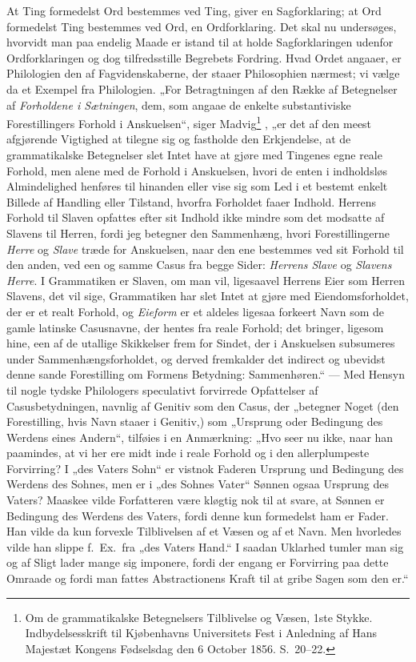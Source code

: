 \documentclass[12pt]{book}
\newcommand{\opage}[1]{\marginnote{\footnotesize\textit{[#1]}}}
\begin{document}
At Ting formedelst Ord bestemmes ved Ting, giver en Sagforklaring; at Ord formedelst Ting bestemmes ved Ord, en Ordforklaring. Det skal nu undersøges, hvorvidt man paa endelig Maade er istand til at holde Sagforklaringen udenfor Ordforklaringen og dog tilfredsstille Begrebets Fordring. Hvad Ordet angaaer, er Philologien den af Fagvidenskaberne, der staaer Philosophien nærmest; vi vælge da et Exempel fra Philologien. „For Betragtningen af den Række af Betegnelser af \emph{Forholdene i Sætningen}, dem, som angaae de enkelte substantiviske Forestillingers Forhold i Anskuelsen“, siger Madvig\footnote{Om de grammatikalske Betegnelsers Tilblivelse og Væsen, 1ste Stykke. Indbydelsesskrift til Kjøbenhavns Universitets Fest i Anledning af Hans Majestæt Kongens Fødselsdag den 6 October 1856. S.~20--22.}%
, „er det af den meest afgjørende Vigtighed at tilegne sig og fastholde den Erkjendelse, at de grammatikalske Betegnelser slet Intet have at gjøre med Tingenes egne reale Forhold, men alene med de Forhold i Anskuelsen, hvori de enten i indholdsløs Almindelighed henføres til hinanden eller vise sig som Led i et bestemt enkelt Billede af Handling eller Tilstand, hvorfra Forholdet faaer Indhold. Herrens Forhold
\opage{5}til Slaven opfattes efter sit Indhold ikke mindre som det modsatte af Slavens til Herren, fordi jeg betegner den Sammenhæng, hvori Forestillingerne \emph{Herre} og \emph{Slave} træde for Anskuelsen, naar den ene bestemmes ved sit Forhold til den anden, ved een og samme Casus fra begge Sider: \emph{Herrens Slave} og \emph{Slavens Herre}. I Grammatiken er Slaven, om man vil, ligesaavel Herrens Eier som Herren Slavens, det vil sige, Grammatiken har slet Intet at gjøre med Eiendomsforholdet, der er et realt Forhold, og \emph{Eieform} er et aldeles ligesaa forkeert Navn som de gamle latinske Casusnavne, der hentes fra reale Forhold; det bringer, ligesom hine, een af de utallige Skikkelser frem for Sindet, der i Anskuelsen subsumeres under Sammenhængsforholdet, og derved fremkalder det indirect og ubevidst denne sande Forestilling om Formens Betydning: Sammenhøren.“ --- Med Hensyn til nogle tydske Philologers speculativt forvirrede Opfattelser af Casusbetydningen, navnlig af Genitiv som den Casus, der „betegner Noget (den Forestilling, hvis Navn staaer i Genitiv,) som „Ursprung oder Bedingung des Werdens eines Andern“,
tilføies i en Anmærkning: „Hvo seer nu ikke, naar han paamindes, at vi her ere midt inde i reale Forhold og i den allerplumpeste Forvirring? I „des Vaters Sohn“ er vistnok Faderen Ursprung und Bedingung des Werdens des Sohnes, men er i „des Sohnes Vater“ Sønnen ogsaa Ursprung des Vaters? Maaskee vilde Forfatteren være kløgtig nok til at svare, at Sønnen er Bedingung des Werdens des Vaters, fordi denne kun formedelst ham er Fader. Han vilde da kun forvexle Tilblivelsen af et Væsen og af et Navn. Men hvorledes vilde han slippe f.\ Ex.\ fra „des Vaters Hand.“ I saadan Uklarhed tumler man sig og af Sligt lader mange sig imponere, fordi der engang er Forvirring paa dette Omraade og fordi man fattes Abstractionens Kraft til at gribe Sagen som den er.“
\end{document}
